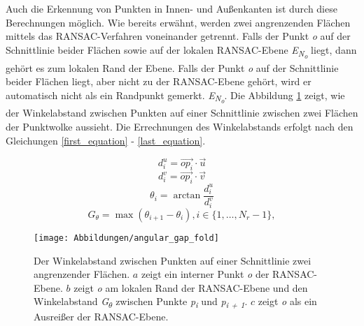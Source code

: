 Auch die Erkennung von Punkten in Innen- und Außenkanten ist durch diese Berechnungen möglich. Wie bereits erwähnt, werden zwei angrenzenden Flächen mittels das RANSAC-Verfahren voneinander getrennt. Falls der Punkt \textit{o} auf der Schnittlinie beider Flächen sowie auf der lokalen RANSAC-Ebene \textit{E\textsubscript{N\textsubscript{o}}} liegt, dann gehört es zum lokalen Rand der Ebene. Falls der Punkt \textit{o} auf der Schnittlinie beider Flächen liegt, aber nicht zu der RANSAC-Ebene gehört, wird er automatisch nicht als ein Randpunkt gemerkt. \textit{E\textsubscript{N\textsubscript{o}}}. Die Abbildung \ref{edge_fold} zeigt, wie der Winkelabstand zwischen Punkten auf einer Schnittlinie zwischen zwei Flächen der Punktwolke aussieht. Die Errechnungen des Winkelabstands erfolgt nach den Gleichungen \ref{first_equation} - \ref{last_equation}.

\begin{equation}
\label{first_equation}
d_i^u = \vec{{op}_i} \cdot \vec{u}
\end{equation}
\begin{equation}
d_i^v = \vec{{op}_i} \cdot \vec{v}
\end{equation}
\begin{equation}
\theta_i = \arctan{\frac{d_i^u}{d_i^v}}
\end{equation}
\begin{equation}
G_\theta = \max(\theta_{i + 1} - \theta_i), i \in \{1, \ldots, N_r - 1\},
\label{last_equation}
\end{equation}

\begin{figure}[h]
	\texttt{[image: Abbildungen/angular\_gap\_fold]}
	\centering
	\caption{Der Winkelabstand zwischen Punkten auf einer Schnittlinie zwei angrenzender Flächen. \textbf{\(a\)} zeigt ein interner Punkt \textit{o} der RANSAC-Ebene. \textbf{\(b\)} zeigt \textit{o} am lokalen Rand der RANSAC-Ebene und den Winkelabstand \textit{G\textsubscript{$\theta$}} zwischen Punkte \textit{p\textsubscript{i}} und \textit{p\textsubscript{i + 1}}. \textbf{\(c\)} zeigt \textit{o} als ein Ausreißer der RANSAC-Ebene. \autocite{ni_edge_2016}}
	\label{edge_fold}
\end{figure}

